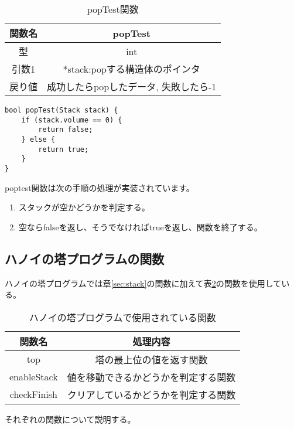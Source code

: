 \documentclass[a4j]{jarticle}
\begin{document}
\begin{table}[h]
  \centering
  \caption{popTest関数}
  \label{tb:poptest}
  \begin{tabular}{|c|c|}
    \hline
    関数名 & popTest                \\
    \hline
    型   & int                    \\
    \hline
    引数1 & *stack:popする構造体のポインタ   \\
    \hline
    戻り値 & 成功したらpopしたデータ, 失敗したら-1 \\
    \hline
  \end{tabular}
\end{table}

\begin{lstlisting}[caption=popTest関数,label=poptestcode]
  bool popTest(Stack stack) {
    if (stack.volume == 0) {
        return false;
    } else {
        return true;
    }
}
\end{lstlisting}

poptest関数は次の手順の処理が実装されています。
\begin{enumerate}
  \item スタックが空かどうかを判定する。
  \item 空ならfalseを返し、そうでなければtrueを返し、関数を終了する。
\end{enumerate}

\subsection{ハノイの塔プログラムの関数}
ハノイの塔プログラムでは章\ref{sec:stack}の関数に加えて表\ref{tb:hanoifunction}の関数を使用している。
\begin{table}[h]
  \centering
  \caption{ハノイの塔プログラムで使用されている関数}
  \label{tb:hanoifunction}
  \begin{tabular}{|c|c|}
    \hline
    関数名         & 処理内容               \\
    \hline
    top         & 塔の最上位の値を返す関数       \\
    \hline
    enableStack & 値を移動できるかどうかを判定する関数 \\
    \hline
    checkFinish & クリアしているかどうかを判定する関数 \\
    \hline
  \end{tabular}
\end{table}

それぞれの関数について説明する。
\end{document}
